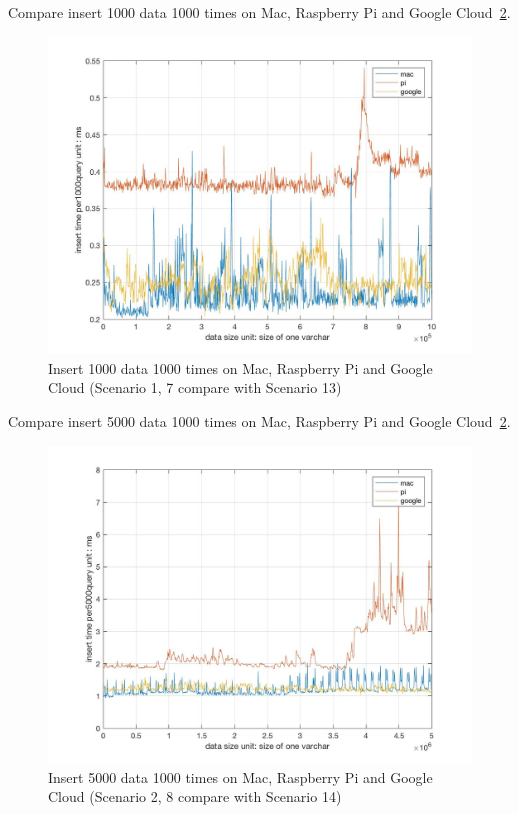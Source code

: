 Compare insert 1000 data 1000 times on Mac, Raspberry Pi and Google 
Cloud~\ref{f:fly}.

\begin{figure}[!ht]
  \centering\includegraphics[width=\columnwidth]
  {images/insert_comp_1000_three.jpg}
  \caption{Insert 1000 data 1000 times on  Mac, Raspberry Pi and Google Cloud
  (Scenario 1, 7 compare with Scenario 13)}\label{f:fly}
\end{figure}


Compare insert 5000 data 1000 times on Mac, Raspberry Pi and Google
 Cloud~\ref{f:fly}.

\begin{figure}[!ht]
  \centering\includegraphics[width=\columnwidth]
  {images/insert_comp_5000_three.jpg}
  \caption{Insert 5000 data 1000 times on  Mac, Raspberry Pi and Google Cloud
  (Scenario 2, 8 compare with Scenario 14)}\label{f:fly}
\end{figure}


